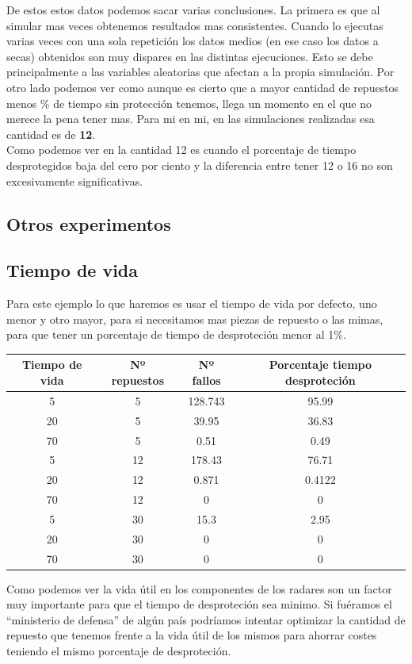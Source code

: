 \documentclass[12pt,a4paper]{article}
\begin{document}
De estos estos datos podemos sacar varias conclusiones. La primera es que al simular mas veces obtenemos resultados mas consistentes. Cuando lo ejecutas varias veces con una sola repetición los datos medios (en ese caso los datos a secas) obtenidos son muy dispares en las distintas ejecuciones. Esto se debe principalmente a las variables aleatorias que afectan a la propia simulación. Por otro lado podemos ver como aunque es cierto que a mayor cantidad de repuestos menos \% de tiempo sin protección tenemos, llega un momento en el que no merece la pena tener mas. Para mi en mi, en las simulaciones realizadas esa cantidad es de \textbf{12}. \\ Como podemos ver en la cantidad 12 es cuando el porcentaje de tiempo desprotegidos baja del cero por ciento y la diferencia entre tener 12 o 16 no son excesivamente significativas.
\subsection{Otros experimentos}
\subsection{Tiempo de vida}
Para este ejemplo lo que haremos es usar el tiempo de vida por defecto, uno menor y otro mayor, para si necesitamos mas piezas de repuesto o las mimas, para que tener un porcentaje de tiempo de desproteción menor al 1\%.
\begin{tabular}{|c|c|c|c|}
	\hline 
	Tiempo de vida & Nº repuestos & Nº fallos & Porcentaje tiempo desproteción \\ 
	\hline  
	\hline
 	5& 5 &128.743 & 95.99 \\  
	20&5 &39.95 & 36.83 \\ 
	70& 5& 0.51 & 0.49 \\ 	
	\hline
	\hline  
	5& 12 &178.43 & 76.71 \\ 
	20&12 &0.871 & 0.4122 \\ 
	70& 12 & 0 & 0 \\ 
	\hline
	\hline  
	5& 30 &15.3 & 2.95 \\ 
	20&30 &0 & 0 \\ 
	70& 30& 0  & 0  \\ 
	\hline   
\end{tabular} 
Como podemos ver la vida útil en los componentes de los radares son un factor muy importante para que el tiempo de desproteción sea minimo. Si fuéramos el ``ministerio de defensa'' de algún país podríamos intentar optimizar la cantidad de repuesto que tenemos frente a la vida útil de los mismos para ahorrar costes teniendo el mismo porcentaje de desproteción. 
\end{document}
